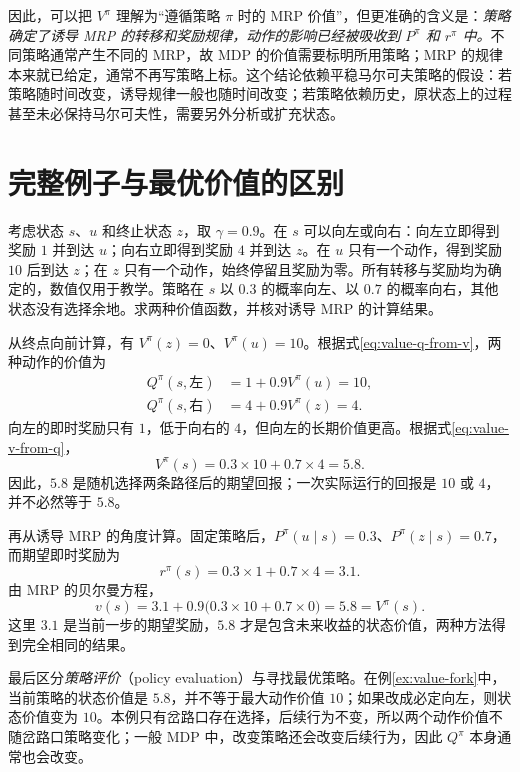 \documentclass[UTF8,12pt,a4paper,fontset=fandol]{ctexart}
\begin{document}
因此，可以把 $V^\pi$ 理解为“遵循策略 $\pi$ 时的 MRP 价值”，但更准确的含义是：\emph{策略确定了诱导 MRP 的转移和奖励规律，动作的影响已经被吸收到 $P^\pi$ 和 $r^\pi$ 中。}不同策略通常产生不同的 MRP，故 MDP 的价值需要标明所用策略；MRP 的规律本来就已给定，通常不再写策略上标。这个结论依赖平稳马尔可夫策略的假设：若策略随时间改变，诱导规律一般也随时间改变；若策略依赖历史，原状态上的过程甚至未必保持马尔可夫性，需要另外分析或扩充状态。

\section{完整例子与最优价值的区别}
\label{sec:value-example}

\begin{example}[同一个岔路口的两种评价]
\label{ex:value-fork}
考虑状态 $s$、$u$ 和终止状态 $z$，取 $\gamma=0.9$。在 $s$ 可以向左或向右：向左立即得到奖励 $1$ 并到达 $u$；向右立即得到奖励 $4$ 并到达 $z$。在 $u$ 只有一个动作，得到奖励 $10$ 后到达 $z$；在 $z$ 只有一个动作，始终停留且奖励为零。所有转移与奖励均为确定的，数值仅用于教学。策略在 $s$ 以 $0.3$ 的概率向左、以 $0.7$ 的概率向右，其他状态没有选择余地。求两种价值函数，并核对诱导 MRP 的计算结果。
\end{example}

\begin{solve}
从终点向前计算，有 $V^\pi(z)=0$、$V^\pi(u)=10$。根据式\eqref{eq:value-q-from-v}，两种动作的价值为
\[
  \begin{aligned}
    Q^\pi(s,\text{左})&=1+0.9V^\pi(u)=10,\\
    Q^\pi(s,\text{右})&=4+0.9V^\pi(z)=4.
  \end{aligned}
\]
向左的即时奖励只有 $1$，低于向右的 $4$，但向左的长期价值更高。根据式\eqref{eq:value-v-from-q}，
\[
  V^\pi(s)=0.3\times10+0.7\times4=5.8.
\]
因此，$5.8$ 是随机选择两条路径后的期望回报；一次实际运行的回报是 $10$ 或 $4$，并不必然等于 $5.8$。

再从诱导 MRP 的角度计算。固定策略后，$P^\pi(u\mid s)=0.3$、$P^\pi(z\mid s)=0.7$，而期望即时奖励为
\[
  r^\pi(s)=0.3\times1+0.7\times4=3.1.
\]
由 MRP 的贝尔曼方程，
\[
  v(s)=3.1+0.9\bigl(0.3\times10+0.7\times0\bigr)=5.8=V^\pi(s).
\]
这里 $3.1$ 是当前一步的期望奖励，$5.8$ 才是包含未来收益的状态价值，两种方法得到完全相同的结果。
\end{solve}

最后区分\emph{策略评价}（policy evaluation）与寻找最优策略。在例\ref{ex:value-fork}中，当前策略的状态价值是 $5.8$，并不等于最大动作价值 $10$；如果改成必定向左，则状态价值变为 $10$。本例只有岔路口存在选择，后续行为不变，所以两个动作价值不随岔路口策略变化；一般 MDP 中，改变策略还会改变后续行为，因此 $Q^\pi$ 本身通常也会改变。
\end{document}
